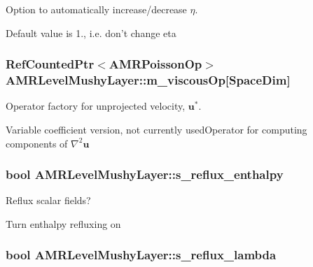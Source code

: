Option to automatically increase/decrease $ \eta $. 

Default value is 1., i.\-e. don't change eta \hypertarget{class_a_m_r_level_mushy_layer_a4d91e3fa25799fc66e74808c545892b6}{
\subsubsection[{m\-\_\-viscous\-Op}]{\setlength{\rightskip}{0pt plus 5cm}Ref\-Counted\-Ptr$<$A\-M\-R\-Poisson\-Op$>$ A\-M\-R\-Level\-Mushy\-Layer\-::m\-\_\-viscous\-Op\mbox{[}Space\-Dim\mbox{]}\hspace{0.3cm}{\ttfamily [protected]}}}\label{class_a_m_r_level_mushy_layer_a4d91e3fa25799fc66e74808c545892b6}


Operator factory for unprojected velocity, $ \mathbf{u}^* $. 

Variable coefficient version, not currently used\-Operator for computing components of $ \nabla^2 \mathbf{u} $ \hypertarget{class_a_m_r_level_mushy_layer_a17f58299941c1b1c2bf58a412d8c91a6}{
\subsubsection[{s\-\_\-reflux\-\_\-enthalpy}]{\setlength{\rightskip}{0pt plus 5cm}bool A\-M\-R\-Level\-Mushy\-Layer\-::s\-\_\-reflux\-\_\-enthalpy\hspace{0.3cm}{\ttfamily [protected]}}}\label{class_a_m_r_level_mushy_layer_a17f58299941c1b1c2bf58a412d8c91a6}


Reflux scalar fields? 

Turn enthalpy refluxing on \hypertarget{class_a_m_r_level_mushy_layer_ad8271cd4dc0e17cc132a28165ccdbbfc}{
\subsubsection[{s\-\_\-reflux\-\_\-lambda}]{\setlength{\rightskip}{0pt plus 5cm}bool A\-M\-R\-Level\-Mushy\-Layer\-::s\-\_\-reflux\-\_\-lambda\hspace{0.3cm}{\ttfamily [protected]}}}\label{class_a_m_r_level_mushy_layer_ad8271cd4dc0e17cc132a28165ccdbbfc}


